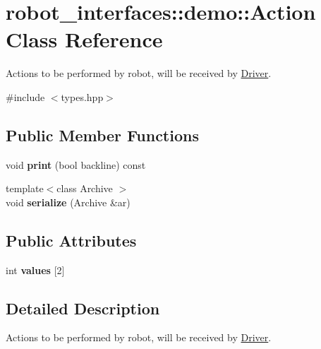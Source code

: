 \hypertarget{classrobot__interfaces_1_1demo_1_1Action}{}\section{robot\+\_\+interfaces\+:\+:demo\+:\+:Action Class Reference}
\label{classrobot__interfaces_1_1demo_1_1Action}


Actions to be performed by robot, will be received by \hyperlink{classDriver}{Driver}.  




{\ttfamily \#include $<$types.\+hpp$>$}

\subsection*{Public Member Functions}
\begin{DoxyCompactItemize}
\item 
void {\bfseries print} (bool backline) const \hypertarget{classrobot__interfaces_1_1demo_1_1Action_a58e903069cbc97a2a736a20f4c7fb05e}{}\label{classrobot__interfaces_1_1demo_1_1Action_a58e903069cbc97a2a736a20f4c7fb05e}

\item 
{\footnotesize template$<$class Archive $>$ }\\void {\bfseries serialize} (Archive \&ar)\hypertarget{classrobot__interfaces_1_1demo_1_1Action_ae26340c1f9b73b3bd4c447572b16f1bf}{}\label{classrobot__interfaces_1_1demo_1_1Action_ae26340c1f9b73b3bd4c447572b16f1bf}

\end{DoxyCompactItemize}
\subsection*{Public Attributes}
\begin{DoxyCompactItemize}
\item 
int {\bfseries values} \mbox{[}2\mbox{]}\hypertarget{classrobot__interfaces_1_1demo_1_1Action_a548fc6556545cd207c10391c8059b57a}{}\label{classrobot__interfaces_1_1demo_1_1Action_a548fc6556545cd207c10391c8059b57a}

\end{DoxyCompactItemize}


\subsection{Detailed Description}
Actions to be performed by robot, will be received by \hyperlink{classDriver}{Driver}. 

